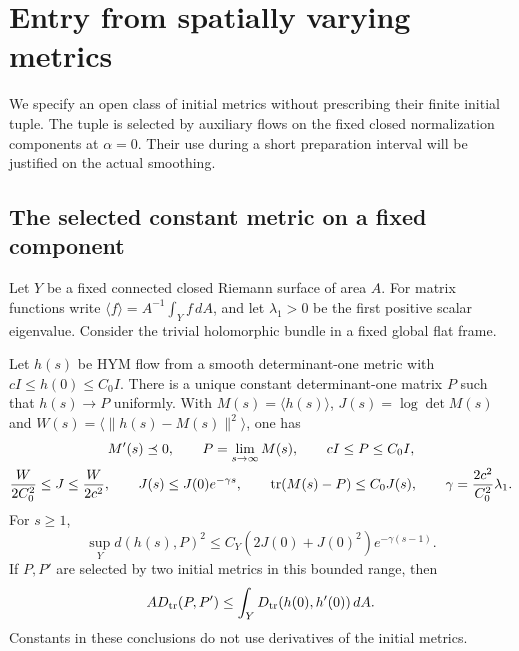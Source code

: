 \section{Entry from spatially varying metrics}\label{sec:entry}

We specify an open class of initial metrics without prescribing their
finite initial tuple. The tuple is selected by auxiliary flows on
the fixed closed normalization components at $\alpha=0$. Their
use during a short preparation interval will be justified on the
actual smoothing.

\subsection{The selected constant metric on a fixed component}
Let $Y$ be a fixed connected closed Riemann surface of area $A$.
For matrix functions write $\langle f\rangle=A^{-1}\int_Y f\,dA$,
and let $\lambda_1>0$ be the first positive scalar eigenvalue.
Consider the trivial holomorphic bundle in a fixed global flat frame.

\begin{lemma}\label{lem:component-phase}
Let $h(s)$ be HYM flow from a smooth determinant-one metric with
$cI\le h(0)\le C_0I$. There is a unique constant determinant-one
matrix $P$ such that $h(s)\to P$ uniformly. With
$M(s)=\langle h(s)\rangle$, $J(s)=\log\det M(s)$ and
$W(s)=\langle\|h(s)-M(s)\|^2\rangle$, one has
\begin{equation}\label{eq:phase-estimates}
 \begin{gathered}
 M'(s)\preceq0,\qquad P=\lim_{s\to\infty}M(s),\qquad
 cI\le P\le C_0I,\\
 \frac{W}{2C_0^2}\le J\le\frac{W}{2c^2},\qquad
 J(s)\le J(0)e^{-\gamma s},\qquad
 \operatorname{tr}(M(s)-P)\le C_0J(s),\qquad
 \gamma=\frac{2c^2}{C_0^2}\lambda_1.
 \end{gathered}
\end{equation}
For $s\ge1$,
\begin{equation}\label{eq:phase-uniform}
 \sup_Y d(h(s),P)^2\le
 C_Y(2J(0)+J(0)^2)e^{-\gamma(s-1)}.
\end{equation}
If $P,P'$ are selected by two initial metrics in this bounded range,
then
\begin{equation}\label{eq:phase-contraction}
 A D_{\operatorname{tr}}(P,P')\le
          \int_Y D_{\operatorname{tr}}(h(0),h'(0))\,dA.
\end{equation}
Constants in these conclusions do not use derivatives of the
initial metrics.
\end{lemma}

